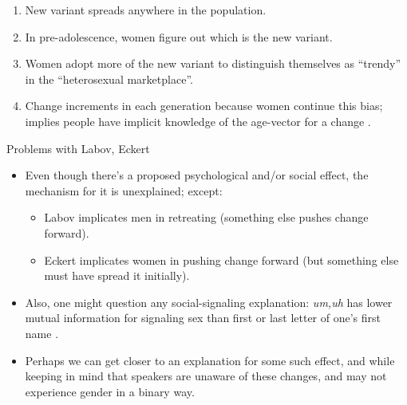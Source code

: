 \documentclass[hyperref={pdfpagelabels=false}]{beamer}
\begin{document}
\begin{frame}{\citet{eckert2011}}
	\begin{enumerate}
	\item New variant spreads anywhere in the population.
	\item In pre-adolescence, women figure out which is the new variant.
	\item Women adopt more of the new variant to distinguish themselves as ``trendy'' in the ``heterosexual marketplace''.
	\item Change increments in each generation because women continue this bias; implies people have implicit knowledge of the age-vector for a change \citep[weak evidence from][]{drager2011}.
	\end{enumerate}
\end{frame}

\begin{frame}{Problems with Labov, Eckert}
	\begin{itemize}
	\item Even though there's a proposed psychological and/or social effect, the mechanism for it is unexplained; except:
		\begin{itemize}
		\item Labov implicates men in retreating (something else pushes change forward).
		\item Eckert implicates women in pushing change forward (but something else must have spread it initially).
		\end{itemize}
	\item Also, one might question any social-signaling explanation: \textsl{um,uh} has lower mutual information for signaling sex than first or last letter of one's first name \citep{fruehwald2015}.
	\item Perhaps we can get closer to an explanation for some such effect, and while keeping in mind that speakers are unaware of these changes, and may not experience gender in a binary way.
	\end{itemize}
\end{frame}



\end{document}

